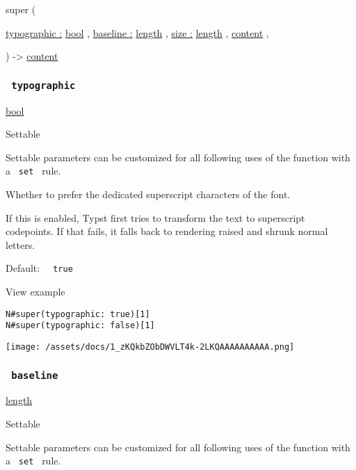 { super } (

{ \hyperref[parameters-typographic]{typographic :}
\href{/docs/reference/foundations/bool/}{bool} , } {
\hyperref[parameters-baseline]{baseline :}
\href{/docs/reference/layout/length/}{length} , } {
\hyperref[parameters-size]{size :}
\href{/docs/reference/layout/length/}{length} , } {
\href{/docs/reference/foundations/content/}{content} , }

) -\textgreater{} \href{/docs/reference/foundations/content/}{content}

\subsubsection{\texorpdfstring{\texttt{\ typographic\ }}{ typographic }}\label{parameters-typographic}

\href{/docs/reference/foundations/bool/}{bool}

{{ Settable }}

\label{parameters-typographic-settable-tooltip}
Settable parameters can be customized for all following uses of the
function with a \texttt{\ set\ } rule.

Whether to prefer the dedicated superscript characters of the font.

If this is enabled, Typst first tries to transform the text to
superscript codepoints. If that fails, it falls back to rendering raised
and shrunk normal letters.

Default: \texttt{\ }{\texttt{\ true\ }}\texttt{\ }


View example

\begin{verbatim}
N#super(typographic: true)[1]
N#super(typographic: false)[1]
\end{verbatim}

\texttt{[image: /assets/docs/1\_zKQkbZObDWVLT4k-2LKQAAAAAAAAAA.png]}

\subsubsection{\texorpdfstring{\texttt{\ baseline\ }}{ baseline }}\label{parameters-baseline}

\href{/docs/reference/layout/length/}{length}

{{ Settable }}

\label{parameters-baseline-settable-tooltip}
Settable parameters can be customized for all following uses of the
function with a \texttt{\ set\ } rule.

